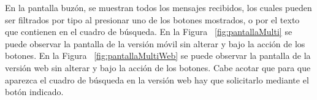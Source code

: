 En la pantalla buzón, se muestran todos los mensajes recibidos, los cuales pueden ser filtrados por tipo al presionar uno de los botones mostrados, o por el texto que contienen en el cuadro de búsqueda. En la Figura ~\ref{fig:pantallaMulti} se puede observar la pantalla de la versión móvil sin alterar y bajo la acción de los botones. En la Figura ~\ref{fig:pantallaMultiWeb} se puede observar la pantalla de la versión web sin alterar y bajo la acción de los botones. Cabe acotar que para que aparezca el cuadro de búsqueda en la versión web hay que solicitarlo mediante el botón indicado.
\begin{figure}[htp]
\centering
  \quad
  \quad

\end{figure}
